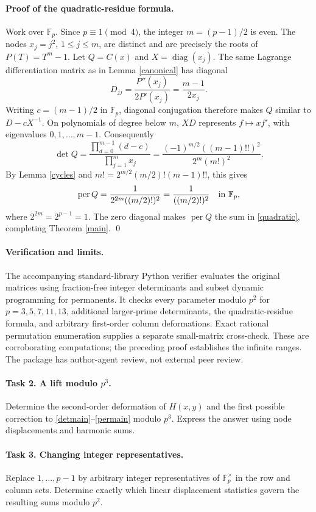 \documentclass[11pt]{article}
\DeclareMathOperator{\per}{per}
\newcommand{\Fp}{\mathbb F_p}
\begin{document}
\paragraph{Proof of the quadratic-residue formula.}
Work over $\Fp$. Since $p\equiv1\pmod4$, the integer $m=(p-1)/2$
is even. The nodes $x_j=j^2$, $1\leq j\leq m$, are distinct and are
precisely the roots of $P(T)=T^m-1$. Let $Q=C(x)$ and
$X=\operatorname{diag}(x_j)$.
The same Lagrange differentiation matrix as in Lemma \ref{canonical}
has diagonal
\[
 D_{jj}=\frac{P''(x_j)}{2P'(x_j)}
       =\frac{m-1}{2x_j}.
\]
Writing $c=(m-1)/2$ in $\Fp$, diagonal conjugation therefore makes
$Q$ similar to $D-cX^{-1}$. On polynomials of degree below $m$,
$XD$ represents $f\mapsto xf'$, with eigenvalues $0,1,\ldots,m-1$.
Consequently
\[
 \det Q=\frac{\prod_{d=0}^{m-1}(d-c)}{\prod_{j=1}^m x_j}
 =\frac{(-1)^{m/2}((m-1)!!)^2}{2^m(m!)^2}.
\]
By Lemma \ref{cycles} and $m!=2^{m/2}(m/2)!(m-1)!!$, this gives
\[
 \per Q=\frac{1}{2^{2m}((m/2)!)^2}
       =\frac1{((m/2)!)^2}\quad\hbox{in }\Fp,
\]
where $2^{2m}=2^{p-1}=1$. The zero diagonal makes $\per Q$ the sum
in \eqref{quadratic}, completing Theorem \ref{main}.
\qed

\paragraph{Verification and limits.}
The accompanying standard-library Python verifier evaluates the original
matrices using fraction-free integer determinants and subset dynamic
programming for permanents. It checks every parameter modulo $p^2$
for $p=3,5,7,11,13$, additional larger-prime determinants, the
quadratic-residue formula, and arbitrary first-order column deformations.
Exact rational permutation enumeration supplies a separate small-matrix
cross-check. These are corroborating computations; the preceding proof
establishes the infinite ranges. The package has author-agent review,
not external peer review.

\paragraph{Task 2. A lift modulo $p^3$.}
Determine the second-order deformation of $H(x,y)$ and the first
possible correction to \eqref{detmain}--\eqref{permain} modulo $p^3$.
Express the answer using node displacements and harmonic sums.

\paragraph{Task 3. Changing integer representatives.}
Replace $1,\ldots,p-1$ by arbitrary integer representatives of
$\Fp^\times$ in the row and column sets. Determine exactly which
linear displacement statistics govern the resulting sums modulo $p^2$.
\end{document}
